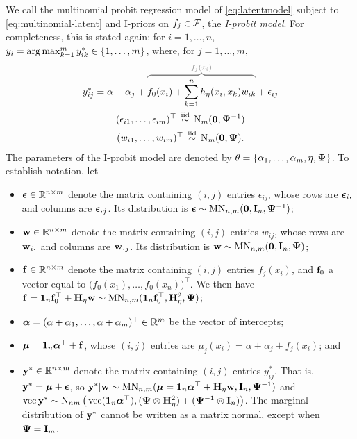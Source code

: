We call the multinomial probit regression model of \cref{eq:latentmodel} subject to \cref{eq:multinomial-latent} and I-priors on $f_j \in {\mathcal F}$, the \emph{I-probit model}.
For completeness, this is stated again: for $i=1,\dots,n$, $y_i = \operatorname*{arg\,max}_{k=1}^m y_{ik}^* \in \{1,\dots,m\}$, where, for $j=1,\dots,m$,
\begin{align}\label{eq:iprobitmod}
  \begin{gathered}
    y_{ij}^* = \alpha + \alpha_j + 
    \greyoverbrace{f_0(x_i) + \sum_{k=1}^n h_\eta(x_i,x_k)w_{ik}}{f_j(x_i)}
    + \epsilon_{ij} \\
    (\epsilon_{i1}, \dots, \epsilon_{im})^\top  \iid \N_m(\bzero, \bPsi^{-1}) \\
    (w_{i1},\dots,w_{im})^\top \iid \N_m(\bzero,\bPsi).
  \end{gathered}
\end{align}
The parameters of the I-probit model are denoted by $\theta = \{\alpha_1,\dots,\alpha_m,\eta,{\bm\Psi} \}$.
To establish notation, let 
\begin{itemize}
  \item ${\bm\epsilon} \in \mathbb{R}^{n \times m}$ denote the matrix containing $(i,j)$ entries $\epsilon_{ij}$, whose rows are $\bepsilon_{i \bigcdot}$ and columns are $\bepsilon_{\bigcdot j}$. Its distribution is ${\bm\epsilon} \sim \operatorname{MN}_{n,m}({\mathbf 0}, {\mathbf I}_n,{\bm\Psi}^{-1})$;
  \item ${\mathbf w} \in \mathbb{R}^{n \times m}$ denote the matrix containing $(i,j)$ entries $w_{ij}$, whose rows are $\bw_{i \bigcdot}$ and columns are $\bw_{\bigcdot j}$. Its distribution is ${\mathbf w} \sim \operatorname{MN}_{n,m}({\mathbf 0}, {\mathbf I}_n,{\bm\Psi})$;
  \item ${\mathbf f} \in \mathbb{R}^{n \times m}$ denote the matrix containing $(i,j)$ entries $f_j(x_i)$, and ${\mathbf f}_0$ a vector equal to $\big(f_0(x_1),\dots,f_0(x_n) \big)^\top$.  We then have ${\mathbf f} = {\mathbf 1}_n{\mathbf f}_0^\top + {\mathbf H}_\eta{\mathbf w} \sim \operatorname{MN}_{n,m}({\mathbf 1}_n{\mathbf f}_0^\top, {\mathbf H}_\eta^2, {\bm\Psi})$;
  \item ${\bm\alpha} = (\alpha + \alpha_1,\dots,\alpha + \alpha_m)^\top\in\mathbb{R}^{m}$ be the vector of intercepts;
  \item ${\bm\mu} = {\mathbf 1}_n{\bm\alpha}^\top + {\mathbf f}$, whose $(i,j)$ entries are $\mu_{j}(x_i) = \alpha + \alpha_j + f_j(x_i)$; and
  \item ${\mathbf y}^* \in \mathbb{R}^{n \times m}$ denote the matrix containing $(i,j)$ entries $y_{ij}^*$. That is, ${\mathbf y}^* = {\bm\mu} + {\bm\epsilon}$, so ${\mathbf y}^*|{\mathbf w} \sim \operatorname{MN}_{n,m}({\bm\mu} = {\mathbf 1}_n{\bm\alpha}^\top + {\mathbf H}_\eta{\mathbf w}, {\mathbf I}_n, {\bm\Psi}^{-1})$ and $\operatorname{vec} {\mathbf y}^* \sim \operatorname{N}_{nm}\big(\operatorname{vec} ({\mathbf 1}_n{\bm\alpha}^\top), ({\bm\Psi} \otimes {\mathbf H}_\eta^2) + ({\bm\Psi}^{-1} \otimes {\mathbf I}_n)\big)$. The marginal distribution of ${\mathbf y}^*$ cannot be written as a matrix normal, except when ${\bm\Psi}={\mathbf I}_m$. 
\end{itemize}

